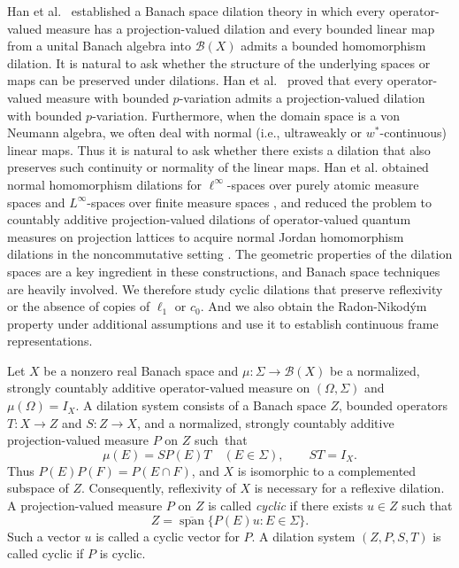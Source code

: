 \documentclass[11pt,leqno]{amsart}
\theoremstyle{compact}
\numberwithin{equation}{section}
\theoremstyle{compactremark}
\theoremstyle{compact}
\newcommand{\1}{\mathbbm{1}}
\begin{document}
Han et al.~\cite{HanLarsonLiuLiu2014} established a Banach space dilation theory in which every operator-valued measure has a projection-valued dilation and every bounded linear map from a unital Banach algebra into $\mathcal B(X)$ admits a bounded homomorphism dilation. It is natural to ask whether the structure of the underlying spaces or maps can be preserved under dilations. Han et al.~\cite{HanLarsonLiu2018} proved that every operator-valued measure with bounded $p$-variation admits a projection-valued dilation with bounded $p$-variation. Furthermore, when the domain space is a von Neumann algebra, we often deal with normal (i.e., ultraweakly or $w^{*}$-continuous) linear maps. Thus it is natural to ask whether there exists a dilation that also preserves such continuity or normality of the linear maps. Han et al. obtained normal homomorphism dilations for $\ell^\infty$-spaces over purely atomic measure spaces \cite{HanLarsonLiuLiu2014} and $L^\infty$-spaces over finite measure spaces \cite{HanLarsonLiu2018}, and reduced the problem to countably additive projection-valued dilations of operator-valued quantum measures on projection lattices to acquire normal Jordan homomorphism dilations in the noncommutative setting \cite{HanHuLarsonLiu2024}. The geometric properties of the dilation spaces are a key ingredient in these constructions, and Banach space techniques are heavily involved. We therefore study cyclic dilations that preserve reflexivity or the absence of copies of $\ell_1$ or $c_0$. And we also obtain the Radon-Nikodým property under additional assumptions and use it to establish continuous frame representations.


Let $X$ be a nonzero real Banach space and $\mu\colon\Sigma\to\mathcal B(X)$ be a normalized, strongly countably additive operator-valued measure on $(\Omega,\Sigma)$ and $\mu(\Omega)=I_X$. A dilation system consists of a Banach space $Z$, bounded operators $T\colon X\to Z$ and $S\colon Z\to X$, and a normalized, strongly countably additive projection-valued measure $P$ on $Z$ such~that
\[
\mu(E)=SP(E)T\quad(E\in\Sigma),\qquad ST=I_X.
\]
Thus $P(E)P(F)=P(E\cap F)$, and $X$ is isomorphic to a complemented subspace of $Z$. Consequently, reflexivity of $X$ is necessary for a reflexive dilation. A projection-valued measure  $P$ on $Z$ is called \textit{cyclic} if there exists $u\in Z$ such that
\[
Z=\overline{\operatorname{span}}\{P(E)u:E\in\Sigma\}.
\]
Such a vector $u$ is called a cyclic vector for $P$. A dilation system $(Z,P,S,T)$ is called cyclic if $P$ is cyclic.
\end{document}
